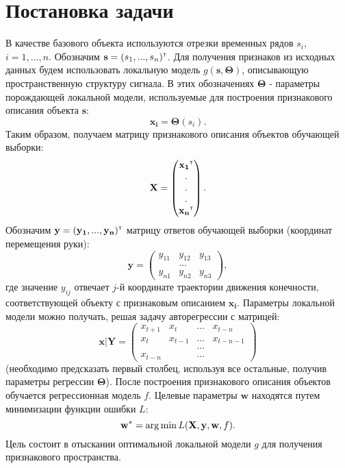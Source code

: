 \documentclass[12pt,twoside]{article}
\begin{document}
\section{Постановка задачи}
В качестве базового объекта используются отрезки временных рядов $s_i$, $i=1,...,n$. Обозначим $\mathbf{s}=(s_1,...,s_n)^{\text{\tiny\sffamily\upshape\mdseries T}}$. Для получения признаков из исходных данных будем использовать локальную модель $g(\mathbf{s}, \mathbf{\Theta})$, описывающую пространственную структуру сигнала. В этих обозначениях $\mathbf{\Theta}$ - параметры порождающей локальной модели, используемые для построения признакового описания объекта $\mathbf{s}$:
\begin{equation}
 \mathbf{x_i} = \mathbf{\Theta}(s_i).
\end{equation}
Таким образом, получаем матрицу признакового описания объектов обучающей выборки:
\begin{equation}
	\mathbf{X}=
	\begin{pmatrix}
		\mathbf{x_1}^{\text{\tiny\sffamily\upshape\mdseries T}}\\
		.\\
		.\\
		.\\
		\mathbf{x_n}^{\text{\tiny\sffamily\upshape\mdseries T}}
	\end{pmatrix}.
\end{equation}
Обозначим $\mathbf{y}=(\mathbf{y_1},...,\mathbf{y_n})^{\text{\tiny\sffamily\upshape\mdseries T}}$ матрицу ответов обучающей выборки (координат перемещения руки):
\begin{equation}
	\mathbf{y}=
	\begin{pmatrix}
		y_{11}&y_{12}&y_{13}\\
		&...&\\
		y_{n1}&y_{n2}&y_{n3}
	\end{pmatrix},
\end{equation} 
где значение $y_{ij}$ отвечает $j$-й координате траектории движения конечности, соответствующей объекту с признаковым описанием $\mathbf{x_i}$. Параметры локальной модели можно получать, решая задачу авторегрессии с матрицей:
\begin{equation}
	\mathbf{x}|\mathbf{Y}=
	\begin{pmatrix}
		x_{t+1}&x_t&...&x_{t-n}\\
		x_t&x_{t-1}&...&x_{t-n-1}\\
		&&...&\\
		x_{t-n}&&...&
	\end{pmatrix}
\end{equation} 
(необходимо предсказать первый столбец, используя все остальные, получив параметры регрессии $\mathbf{\Theta}$).
После построения признакового описания объектов обучается регрессионная модель $f$. Целевые параметры $\mathbf{w}$ находятся путем минимизации функции ошибки $L$:
\begin{equation}
	\mathbf{w^*} = \argmin L(\mathbf{X}, \mathbf{y}, \mathbf{w}, f).
\end{equation}
Цель состоит в отыскании оптимальной локальной модели $g$ для получения признакового пространства.


\end{document}
